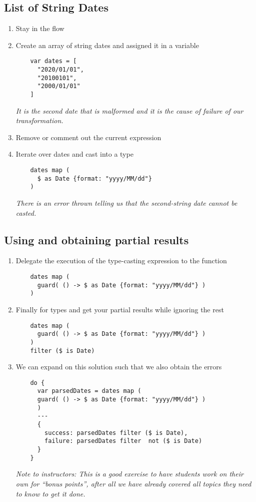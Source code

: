 \subsection{List of String Dates}
\begin{enumerate}
\item Stay in the  flow
\item Create an array of string dates and assigned it in a variable
  \begin{verbatim}
    var dates = [
      "2020/01/01",
      "20100101",
      "2000/01/01"
    ]
  \end{verbatim}
  \emph{
    It is the second date that is malformed and it is the cause of failure of our transformation.
  }
\item Remove or comment out the current expression
\item Iterate over dates and cast into a  type
  \begin{verbatim}
    dates map (
      $ as Date {format: "yyyy/MM/dd"}
    )
  \end{verbatim}
  \emph{
    There is an error thrown telling us that the second-string date cannot be casted.
  }
\end{enumerate}

\subsection{Using  and obtaining partial results}
\begin{enumerate}[resume*]
\item Delegate the execution of the type-casting expression to the  function
  \begin{verbatim}
    dates map (
      guard( () -> $ as Date {format: "yyyy/MM/dd"} )
    ) 
  \end{verbatim}
\item Finally  for  types and get your partial results while ignoring the rest
  \begin{verbatim}
    dates map (
      guard( () -> $ as Date {format: "yyyy/MM/dd"} )
    )
    filter ($ is Date)
  \end{verbatim}
\item We can expand on this solution such that we also obtain the errors
  \begin{verbatim}
    do {
      var parsedDates = dates map (
      guard( () -> $ as Date {format: "yyyy/MM/dd"} )
      )
      ---
      {
        success: parsedDates filter ($ is Date),
        failure: parsedDates filter  not ($ is Date)
      }
    }
  \end{verbatim}
  \emph{
    Note to instructors: This is a good exercise to have students work on their own for ``bonus points'', after all we have already covered all topics they need to know to get it done.
  }
\end{enumerate}
